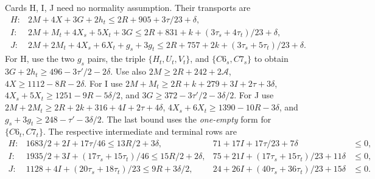 \documentclass[11pt,letterpaper]{article}
\theoremstyle{definition}\newtheorem{definition}[theorem]{Definition}
\begin{document}
Cards H, I, J need no normality assumption. Their transports are
\begin{align*}
H: &2M+4X+3G+2h_t\le2R+905+3\tau/23+\delta,\\
I: &2M+M_t+4X_s+5X_t+3G
 \le2R+831+k+(3\tau_s+4\tau_t)/23+\delta,\\
J: &2M+2M_t+4X_s+6X_t+g_s+3g_t
 \le2R+757+2k+(3\tau_s+5\tau_t)/23+\delta.
\end{align*}
For H, use the two $g_s$ pairs, the triple $\{H_t,U_t,V_t\}$,
and $\{C6_s,C7_s\}$ to obtain
$3G+2h_t\ge496-3\tau'/2-2\delta$.
Use also $2M\ge2R+242+2\mathcal A$, $4X\ge1112-8R-2\delta$.
For I use
$2M+M_t\ge2R+k+279+3I+2\tau+3\delta$,
$4X_s+5X_t\ge1251-9R-5\delta/2$, and
$3G\ge372-3\tau'/2-3\delta/2$.
For J use
$2M+2M_t\ge2R+2k+316+4I+2\tau+4\delta$,
$4X_s+6X_t\ge1390-10R-3\delta$, and
$g_s+3g_t\ge248-\tau'-3\delta/2$.
The last bound uses the \emph{one-empty} form for $\{C6_t,C7_t\}$.
The respective intermediate and terminal rows are
\begin{align*}
H: &1683/2+2I+17\tau/46\le13R/2+3\delta,
 &71+17I+17\tau/23+7\delta&\le0,\\
I: &1935/2+3I+(17\tau_s+15\tau_t)/46\le15R/2+2\delta,
 &75+21I+(17\tau_s+15\tau_t)/23+11\delta&\le0,\\
J: &1128+4I+(20\tau_s+18\tau_t)/23\le9R+3\delta/2,
 &24+26I+(40\tau_s+36\tau_t)/23+15\delta&\le0.
\end{align*}
\end{document}
